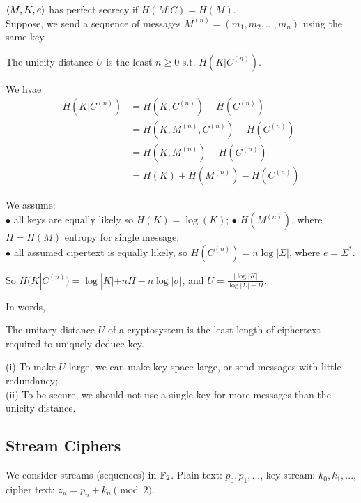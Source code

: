 \documentclass[a4paper]{article}
\begin{document}
\begin{rem}
$\langle M,K,e \rangle$ has perfect secrecy if $H(M|C) = H(M)$.\\
Suppose, we send a sequence of messages $M^{(n)} = (m_1,m_2,...,m_n)$ using the same key.
\end{rem}

\begin{defi}
The unicity distance $U$ is the least $n \geq 0$ s.t. $H(K| C^{(n)})$.
\end{defi}

We hvae
\begin{equation*}
\begin{aligned}
H(K|C^{(n)}) &= H(K,C^{(n)}) - H(C^{(n)})\\
&= H(K,M^{(n)},C^{(n)}) - H(C^{(n)})\\
&= H(K,M^{(n)}) - H(C^{(n)})\\
&= H(K) + H(M^{(n)}) - H(C^{(n)})
\end{aligned}
\end{equation*}

We assume:\\
$\bullet$ all keys are equally likely so $H(K) = \log (K)$;
$\bullet$ $H(M^{(n)})$, where $H=H(M)$ entropy for single message;\\
$\bullet$ all assumed cipertext is equally likely, so $H(C^{(n)}) = n \log |\Sigma|$, where $e = \Sigma^*$.

So $H(K|C^{(n)}) = \log |K| + nH - n\log |\sigma|$, and $U =\frac{|\log |K|}{\log |\Sigma|-H}$.

In words,

\begin{defi}
The unitary distance $U$ of a cryptosystem is the least length of ciphertext required to uniquely deduce key.
\end{defi}

\begin{rem}
(i) To make $U$ large, we can make key space large, or send messages with little redundancy;\\
(ii) To be secure, we should not use a single key for more messages than the unicity distance.
\end{rem}

\subsection{Stream Ciphers}
We consider streams (sequences) in $\mathbb{F}_2$. Plain text: $p_0,p_1,...$, key stream: $k_0,k_1,...$, cipher text: $z_n = p_n + k_n \pmod 2$.
\end{document}
